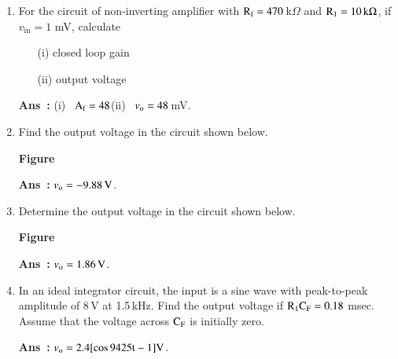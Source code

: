 \begin{enumerate}
\item For the circuit of non-inverting amplifier with $\textrm{R}_{\textrm{f}}=470$\,k$\Omega$ and $\textrm{R}_{1}=10\,\textrm{k}\Omega$, if $v_{\text{in}}=1$ mV, calculate
\begin{itemize}
\item[(i)] closed loop gain

\item[(ii)] output voltage
\end{itemize}

\smallskip
\noindent
{\bf Ans~:} (i)~ $\textrm{A}_{\textrm{f}}=48$\quad (ii)~ $v_{\textrm{o}}=48$\,mV.

\item Find the output voltage in the circuit shown below.
\begin{center}
{\bf Figure}
\end{center}

\smallskip
\noindent
{\bf Ans~:} $v_{\textrm{o}}=-9.88\,\textrm{V}$.

\item Determine the output voltage in the circuit shown below.
\begin{center}
{\bf Figure}
\end{center}

\smallskip
\noindent
{\bf Ans~:} $v_{\textrm{o}}=1.86\,\textrm{V}$.

\item In an ideal integrator circuit, the input is a sine wave with peak-to-peak amplitude of 8\,V at 1.5\,kHz. Find the output voltage if $\textrm{R}_{1}\textrm{C}_{\textrm{F}}=0.18$ msec. Assume that the voltage across $\textrm{C}_{\textrm{F}}$ is initially zero.

\smallskip
\noindent
{\bf Ans~:} $v_{\textrm{o}}=2.4[\cos 9425\textrm{t}-1]\textrm{V}$.
\end{enumerate}


\label{1end}
